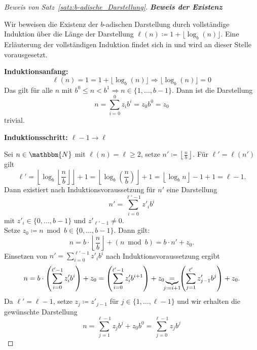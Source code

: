 \documentclass{article}
\newcommand{\N}{\mathbbm{N}} %
\begin{document}
\begin{proof}[Beweis von Satz~\ref{satz:b-adische_Darstellung}]
      \noindent\textbf{\textit{Beweis der Existenz}}

      Wir beweisen die Existenz der $b$-adischen Darstellung durch vollständige Induktion über die Länge der Darstellung $\ell(n) \coloneq 1+ \lfloor \log_b(n) \rfloor$. 
      Eine Erläuterung der vollständigen Induktion findet sich in \cite[S.~26]{hougardy2018} und wird an dieser Stelle vorausgesetzt.

      \textbf{Induktionsanfang:} 
      \begin{equation*}
        \ell(n) = 1 = 1+ \lfloor \log_b(n) \rfloor \Rightarrow \lfloor \log_b(n) \rfloor = 0
      \end{equation*}
      Das gilt für alle $n$ mit $b^0 \leq n < b^1 \Rightarrow n \in \{1, \dots, b-1\}$. 
      Dann ist die Darstellung \[n = \sum_{i=0}^0 z_i b^i = z_0 b^0 = z_0\] trivial.

      \textbf{Induktionsschritt: $\ell-1 \to \ell$} 

      Sei $n\in\N$ mit $\ell(n) = \ell \geq 2$, setze $n' \coloneq \left\lfloor \displaystyle\frac{n}{b} \right\rfloor$.
      Für $\ell' = \ell(n')$ gilt \[\ell' = \left\lfloor \log_b \left\lfloor \frac{n}{b} \right\rfloor \right\rfloor + 1 = \left\lfloor \log_b (\frac{n}{b}) \right\rfloor + 1 = \left\lfloor \log_b n \right\rfloor - 1 + 1 = \ell - 1.\]
      Dann existiert nach Induktionsvoraussetzung für $n'$ eine Darstellung 
      \[n' = \sum_{i=0}^{\ell' -1} z'_i b^i\] 
      mit $z'_i \in \{0,\dots,b-1\} \text{ und } z'_{\ell'-1} \neq 0$. \\
      Setze $z_0 \coloneq n \bmod b \in \{0, \dots, b-1 \}$. Dann gilt:
      \[n = b \cdot \left\lfloor \frac{n}{b} \right\rfloor + (n \bmod b) = b \cdot n' + z_0.\]
      Einsetzen von $n' = \displaystyle\sum_{i=0}^{\ell'-1}z'_i b^i$ nach Induktionsvoraussetzung ergibt
      \begin{align*}
        n = b\cdot \left(\sum_{i=0}^{\ell'-1}z'_i b^i\right) + z_0 = \left(\sum_{i=0}^{\ell'-1}z'_i b^{i+1}\right) + z_0
        \underbrace{=}_{\mathclap{j\coloneq i+1}} \left(\sum_{j=1}^{\ell'} z'_{j-1}b^j\right) + z_0.
      \end{align*}
      Da $\ell' = \ell-1$, setze $z_j \coloneq z'_{j-1}$ für $j \in \{1,\dots,\ell-1\}$ und wir erhalten die gewünschte Darstellung
      \begin{equation*}
        n = \sum_{j=1}^{\ell-1} z_j b^j + z_0 b^0 = \sum_{j=0}^{\ell-1} z_jb^j
      \end{equation*}

    \end{proof}
\end{document}
